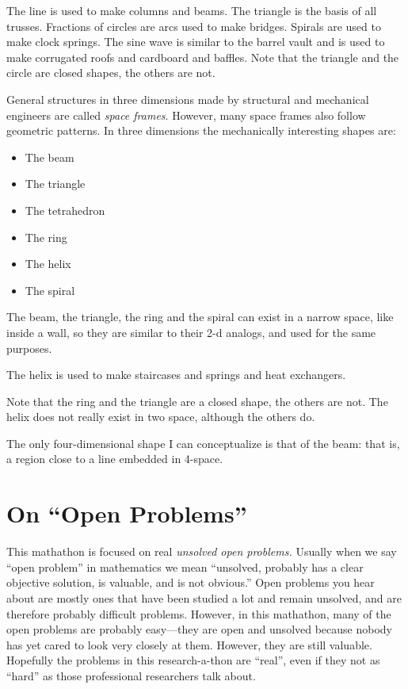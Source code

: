 \documentclass[11pt]{article}
\begin{document}
The line is used to make columns and beams. The triangle is the basis of all trusses.
Fractions of circles are arcs used to make bridges. Spirals are used to make clock springs.
The sine wave is similar to the barrel vault and is used to make corrugated roofs and cardboard
and baffles.
Note that the triangle and the circle are closed shapes, the others are not.

General structures in three dimensions made by structural and mechanical engineers are
called {\em space frames}. However, many space frames also follow geometric patterns.
In three dimensions the mechanically interesting shapes are:
\begin{itemize}
\item The beam
\item The triangle
\item The tetrahedron
\item The ring
\item The helix
\item The spiral
\end{itemize}

The beam, the triangle, the ring and the spiral can exist in a narrow space, like inside a wall,
so they are similar to their 2-d analogs, and used for the same purposes.

The helix is used to make staircases and springs and heat exchangers.

Note that the ring and the triangle are a closed shape, the others are not.
The helix does not really exist in two space, although the others do.

The only four-dimensional shape I can conceptualize is that of the
beam: that is, a region close to a line embedded in 4-space.

\section{On ``Open Problems''}

This mathathon is focused on real {\em unsolved open problems.}
Usually when we say ``open problem'' in mathematics we mean ``unsolved, probably has a clear objective solution, is valuable,
and is not obvious.''
Open problems you hear about are mostly ones that have been studied a lot and remain unsolved, and are therefore probably difficult problems.
However, in this mathathon, many of the open problems are probably easy---they are open and unsolved because nobody has yet
cared to look very closely at them.  However, they are still valuable. Hopefully the problems in this research-a-thon are ``real'', even if they
not as ``hard'' as those professional researchers talk about.
\end{document}
